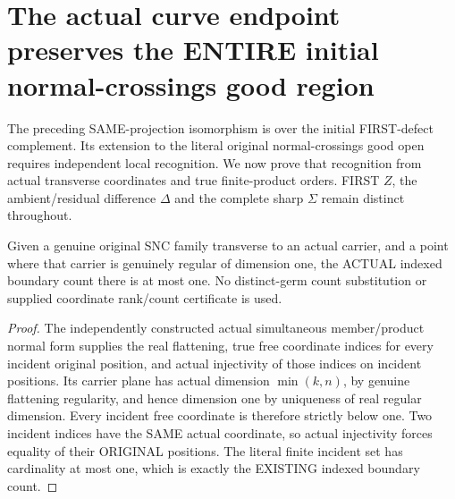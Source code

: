 \section{The actual curve endpoint preserves the ENTIRE initial normal-crossings good region}

The preceding SAME-projection isomorphism is over the initial FIRST-defect
complement. Its extension to the literal original normal-crossings good
open requires independent local recognition. We now prove that recognition
from actual transverse coordinates and true finite-product orders. FIRST
$Z$, the ambient/residual difference $\Delta$ and the complete sharp
$\Sigma$ remain distinct throughout.

\begin{lemma}
\label{hir:sharp-actual-transverse-curve-indexed-incidence-bound}
\leanok
Given a genuine original SNC family transverse to an actual carrier,
and a point where that carrier is genuinely regular of dimension one,
the ACTUAL indexed boundary count there is at most one. No distinct-germ
count substitution or supplied coordinate rank/count certificate is used.
\end{lemma}
\begin{proof}
The independently constructed actual simultaneous member/product normal
form supplies the real flattening, true free coordinate indices for every
incident original position, and actual injectivity of those indices on
incident positions. Its carrier plane has actual dimension $\min(k,n)$,
by genuine flattening regularity, and hence dimension one by uniqueness
of real regular dimension. Every incident free coordinate is therefore
strictly below one. Two incident indices have the SAME actual coordinate,
so actual injectivity forces equality of their ORIGINAL positions. The
literal finite incident set has cardinality at most one, which is exactly
the EXISTING indexed boundary count.
\end{proof}

